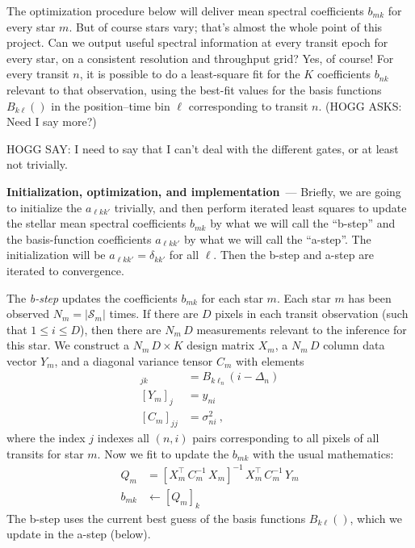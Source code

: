 \documentclass{article}
\renewcommand{\paragraph}[1]{\bigskip\par\noindent\textbf{#1}~---}
\newcommand{\set}[1]{\mathscr{#1}}
\begin{document}
The optimization procedure below will deliver mean spectral coefficients $b_{mk}$ for every star $m$.
But of course stars vary; that's almost the whole point of this project.
Can we output useful spectral information at every transit epoch for every star, on a consistent resolution and throughput grid?
Yes, of course!
For every transit $n$, it is possible to do a least-square fit for the $K$ coefficients $b_{nk}$ relevant to that observation, using the best-fit values for the basis functions $B_{k\ell}()$ in the position--time bin $\ell$ corresponding to transit $n$.
(HOGG ASKS: Need I say more?)

HOGG SAY: I need to say that I can't deal with the different gates, or at least not trivially.

\paragraph{Initialization, optimization, and implementation}
Briefly, we are going to initialize the $a_{\ell kk'}$ trivially, and then perform iterated least squares to update the stellar mean spectral coefficients $b_{mk}$ by what we will call the ``b-step'' and the basis-function coefficients $a_{\ell kk'}$ by what we will call the ``a-step''.
The initialization will be $a_{\ell kk'}=\delta_{kk'}$ for all $\ell$.
Then the b-step and a-step are iterated to convergence.

The \emph{b-step} updates the coefficients $b_{mk}$ for each star $m$.
Each star $m$ has been observed $N_m=|\set{S}_m|$ times.
If there are $D$ pixels in each transit observation (such that $1\leq i\leq D$), then there are $N_m\,D$ measurements relevant to the inference for this star.
We construct a $N_m\,D\times K$ design matrix $X_m$, a $N_m\,D$ column data vector $Y_m$, and a diagonal variance tensor $C_m$ with elements 
\begin{align}
    [X_m]_{jk} &= B_{k\ell_n}(i-\Delta_n) \\
    [Y_m]_j &= y_{ni} \\
    [C_m]_{jj} &= \sigma^2_{ni} ~,
\end{align}
where the index $j$ indexes all $(n,i)$ pairs corresponding to all pixels of all transits for star $m$.
Now we fit to update the $b_{mk}$ with the usual mathematics:
\begin{align}
    Q_m &= [X_m^\top\,C^{-1}_m\,X_m]^{-1}\,X_m^\top\,C^{-1}_m\,Y_m \\
    b_{mk} &\leftarrow [Q_m]_{k}
\end{align}
The b-step uses the current best guess of the basis functions $B_{k\ell}()$, which we update in the a-step (below).
\end{document}
